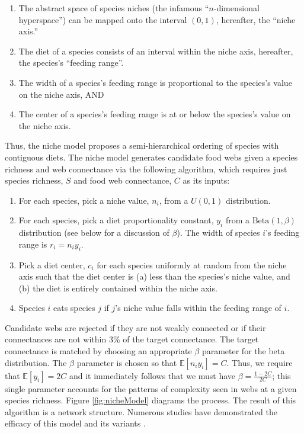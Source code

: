\documentclass[/home/nkappler/Research/Dissertation/
 dissertation.tex]{subfiles}
\begin{document}
\begin{bibunit}
\begin{enumerate}
    \item The abstract space of species niches (the infamous ``$n$-dimensional
        hyperspace'') can be mapped onto the interval $(0,1)$,
        hereafter, the ``niche axis.''
    \item The diet of a species consists of an interval within the niche
        axis, hereafter, the species's ``feeding range''.
    \item The width of a  species's feeding range is proportional to the
        species's value on the niche axis, AND
    \item The center of a species's feeding range is at or below the species's
        value on the niche axis.
\end{enumerate}

Thus, the niche model proposes a semi-hierarchical ordering of species with
contiguous diets. The niche model generates candidate food webs given a species
richness and web connectance via the following algorithm, which requires just
species richness, $S$ and food web connectance, $C$ as its inputs:

\begin{enumerate}
    \item For each species, pick a niche value, $n_i$, from a $U(0,1)$ distribution.
    \item For each species, pick a diet proportionality constant, $y_i$ from a
        $\text{Beta}(1,\beta)$ distribution (see below for a discussion of
        $\beta$). The width of species $i$'s feeding range is $r_i = n_iy_i$.
    \item Pick a diet center, $c_i$ for each species uniformly at random from
        the niche axis such that the diet center is (a) less than the species's
        niche value, and (b) the diet is entirely contained within the niche
        axis.
    \item Species $i$ eats species $j$ if $j$'s niche value falls within the
        feeding range of $i$.
\end{enumerate}

Candidate webs are rejected if they are not weakly connected or if their
connectances are not within 3\% of the target connectance. The target
connectance is matched by choosing an appropriate $\beta$ parameter for the
beta distribution. The $\beta$ parameter is chosen so that
$\mathbb{E}[n_iy_i]=C$. Thus, we require that $\mathbb{E}[y_i]=2C$ and it
immediately follows that we must have $\beta = \frac{1-2C}{2C}$; this single
parameter accounts for the patterns of complexity seen in webs at a given
species richness. Figure \ref{fig:nicheModel} diagrams the process. The result
of this algorithm is a network structure. Numerous studies have demonstrated
the efficacy of this model and its variants
\cite*{Williams2000,Allesina2008,Williams2008b}.


\end{bibunit}
\end{document}
